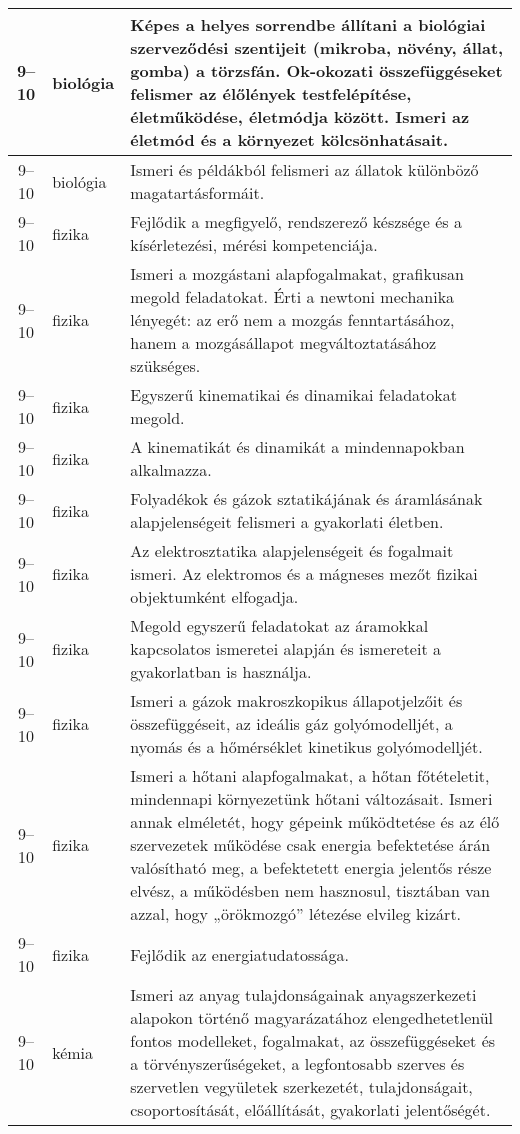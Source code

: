 \begin{small}
\begin{longtable}{c | p{2cm} |  p{11cm} }
              9--10 & biológia & Képes a helyes sorrendbe állítani a biológiai szerveződési szentijeit (mikroba, növény, állat, gomba) a törzsfán. Ok-okozati összefüggéseket felismer az élőlények testfelépítése, életműködése, életmódja között. Ismeri az életmód és a környezet kölcsönhatásait. \\ \hline
              9--10 & biológia & Ismeri és példákból felismeri az állatok különböző magatartásformáit. \\ \hline
              9--10 & fizika & Fejlődik a megfigyelő, rendszerező készsége és a kísérletezési, mérési kompetenciája. \\ \hline
              9--10 & fizika & Ismeri a mozgástani alapfogalmakat, grafikusan megold feladatokat. Érti a newtoni mechanika lényegét: az erő nem a mozgás fenntartásához, hanem a mozgásállapot megváltoztatásához szükséges. \\ \hline
              9--10 & fizika & Egyszerű kinematikai és dinamikai feladatokat megold. \\ \hline
              9--10 & fizika & A kinematikát és dinamikát a mindennapokban alkalmazza. \\ \hline
              9--10 & fizika & Folyadékok és gázok sztatikájának és áramlásának alapjelenségeit felismeri a gyakorlati életben. \\ \hline
              9--10 & fizika & Az elektrosztatika alapjelenségeit és fogalmait ismeri. Az elektromos és a mágneses mezőt fizikai objektumként elfogadja. \\ \hline
              9--10 & fizika & Megold egyszerű feladatokat az áramokkal kapcsolatos ismeretei alapján és ismereteit a gyakorlatban is használja. \\ \hline
              9--10 & fizika & Ismeri a gázok makroszkopikus állapotjelzőit és összefüggéseit, az ideális gáz golyómodelljét, a nyomás és a hőmérséklet kinetikus golyómodelljét. \\ \hline
              9--10 & fizika & Ismeri a hőtani alapfogalmakat, a hőtan főtételetit, mindennapi környezetünk hőtani változásait. Ismeri annak elméletét, hogy gépeink működtetése és az élő szervezetek működése csak energia befektetése árán valósítható meg, a befektetett energia jelentős része elvész, a működésben nem hasznosul, tisztában van azzal, hogy  „örökmozgó” létezése elvileg kizárt. \\ \hline
              9--10 & fizika & Fejlődik az energiatudatossága. \\ \hline
              9--10 & kémia & Ismeri az anyag tulajdonságainak anyagszerkezeti alapokon történő magyarázatához elengedhetetlenül fontos modelleket, fogalmakat, az összefüggéseket és a törvényszerűségeket, a legfontosabb szerves és szervetlen vegyületek szerkezetét, tulajdonságait, csoportosítását, előállítását, gyakorlati jelentőségét. \\ \hline

\end{longtable}
\end{small}
